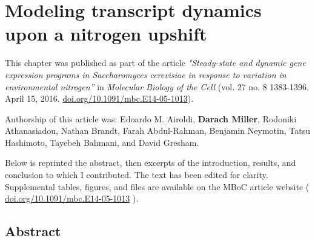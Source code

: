 \chapter{Modeling transcript dynamics upon a nitrogen upshift}

This chapter was published as part of the article 
\textit{"Steady-state and dynamic gene expression programs in 
Saccharomyces cerevisiae in response to variation in 
environmental nitrogen”} in \textit{Molecular Biology of the Cell}
(vol. 27 no. 8 1383-1396. April 15, 2016.
\url{doi.org/10.1091/mbc.E14-05-1013}).

Authorship of this article was: Edoardo M. Airoldi, 
\textbf{Darach Miller},
Rodoniki Athanasiadou, Nathan Brandt, Farah Abdul-Rahman, Benjamin
Neymotin, Tatsu Hashimoto, Tayebeh Bahmani, and David Gresham. 

Below is reprinted the abstract, then excerpts of the introduction,
results, and conclusion to which I contributed. 
The text has been edited for clarity. Supplemental tables,
figures, and files are available on the MBoC article website (
\url{doi.org/10.1091/mbc.E14-05-1013} ).  

\section{Abstract} 

